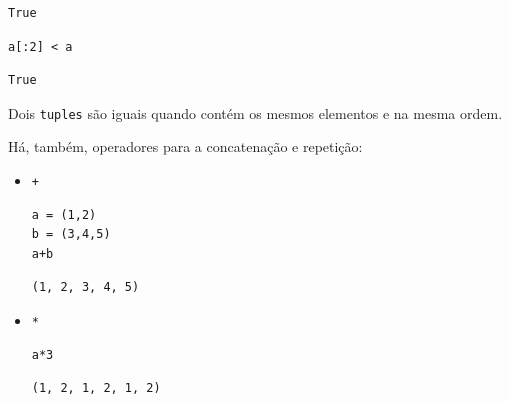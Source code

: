 \begin{verbatim}
True
\end{verbatim}

\begin{lstlisting}
a[:2] < a
\end{lstlisting}

\begin{verbatim}
True
\end{verbatim}


\ifisbook
\vspace{0.2cm}
\fi

\begin{obs}
  Dois \texttt{tuples} são iguais quando contém os mesmos elementos e na mesma ordem.
\end{obs}

\ifisbook
\vspace{0.2cm}
\fi

Há, também, operadores para a concatenação e repetição:
\begin{itemize}
\item \lstinline!+! 

\begin{lstlisting}[xrightmargin=2.5em]
a = (1,2)
b = (3,4,5)
a+b
\end{lstlisting}

\begin{verbatim}
(1, 2, 3, 4, 5)
\end{verbatim}

\item \lstinline!*! 

\begin{lstlisting}[xrightmargin=2.5em]
a*3
\end{lstlisting}

\begin{verbatim}
(1, 2, 1, 2, 1, 2)
\end{verbatim}

\end{itemize}

